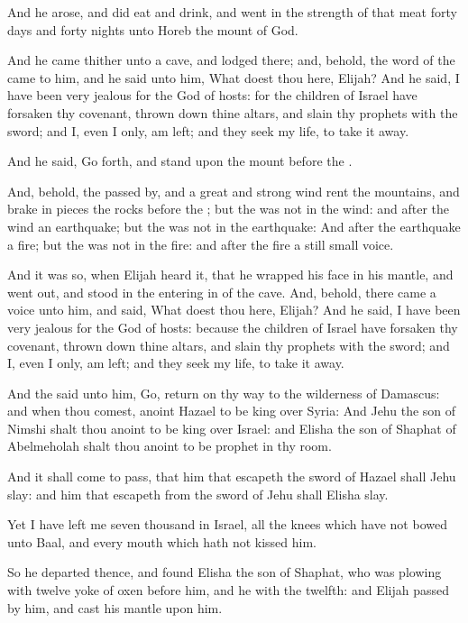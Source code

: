 \verse And he arose, and did eat and drink, and went in the strength of that meat forty days and forty nights unto Horeb the mount of God.

\verse And he came thither unto a cave, and lodged there; and, behold, the word of the \LORD came to him, and he said unto him, What doest thou here, Elijah?  \verse And he said, I have been very jealous for the \LORD God of hosts: for the children of Israel have forsaken thy covenant, thrown down thine altars, and slain thy prophets with the sword; and I, even I only, am left; and they seek my life, to take it away.

\verse And he said, Go forth, and stand upon the mount before the \LORD.

And, behold, the \LORD passed by, and a great and strong wind rent the mountains, and brake in pieces the rocks before the \LORD; but the \LORD was not in the wind: and after the wind an earthquake; but the \LORD was not in the earthquake: \verse And after the earthquake a fire; but the \LORD was not in the fire: and after the fire a still small voice.

\verse And it was so, when Elijah heard it, that he wrapped his face in his mantle, and went out, and stood in the entering in of the cave.  And, behold, there came a voice unto him, and said, What doest thou here, Elijah?  \verse And he said, I have been very jealous for the \LORD God of hosts: because the children of Israel have forsaken thy covenant, thrown down thine altars, and slain thy prophets with the sword; and I, even I only, am left; and they seek my life, to take it away.

\verse And the \LORD said unto him, Go, return on thy way to the wilderness of Damascus: and when thou comest, anoint Hazael to be king over Syria: \verse And Jehu the son of Nimshi shalt thou anoint to be king over Israel: and Elisha the son of Shaphat of Abelmeholah shalt thou anoint to be prophet in thy room.

\verse And it shall come to pass, that him that escapeth the sword of Hazael shall Jehu slay: and him that escapeth from the sword of Jehu shall Elisha slay.

\verse Yet I have left me seven thousand in Israel, all the knees which have not bowed unto Baal, and every mouth which hath not kissed him.

\verse So he departed thence, and found Elisha the son of Shaphat, who was plowing with twelve yoke of oxen before him, and he with the twelfth: and Elijah passed by him, and cast his mantle upon him.

